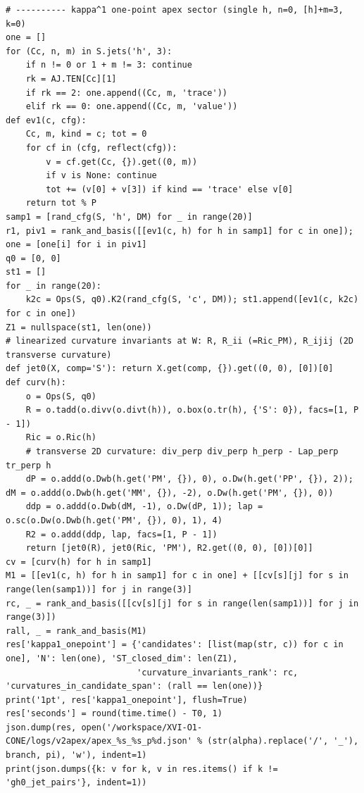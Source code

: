 \documentclass[10pt]{article}
\begin{document}
\begin{lstlisting}
# ---------- kappa^1 one-point apex sector (single h, n=0, [h]+m=3, k=0)
one = []
for (Cc, n, m) in S.jets('h', 3):
    if n != 0 or 1 + m != 3: continue
    rk = AJ.TEN[Cc][1]
    if rk == 2: one.append((Cc, m, 'trace'))
    elif rk == 0: one.append((Cc, m, 'value'))
def ev1(c, cfg):
    Cc, m, kind = c; tot = 0
    for cf in (cfg, reflect(cfg)):
        v = cf.get(Cc, {}).get((0, m))
        if v is None: continue
        tot += (v[0] + v[3]) if kind == 'trace' else v[0]
    return tot % P
samp1 = [rand_cfg(S, 'h', DM) for _ in range(20)]
r1, piv1 = rank_and_basis([[ev1(c, h) for h in samp1] for c in one]); one = [one[i] for i in piv1]
q0 = [0, 0]
st1 = []
for _ in range(20):
    k2c = Ops(S, q0).K2(rand_cfg(S, 'c', DM)); st1.append([ev1(c, k2c) for c in one])
Z1 = nullspace(st1, len(one))
# linearized curvature invariants at W: R, R_ii (=Ric_PM), R_ijij (2D transverse curvature)
def jet0(X, comp='S'): return X.get(comp, {}).get((0, 0), [0])[0]
def curv(h):
    o = Ops(S, q0)
    R = o.tadd(o.divv(o.divt(h)), o.box(o.tr(h), {'S': 0}), facs=[1, P - 1])
    Ric = o.Ric(h)
    # transverse 2D curvature: div_perp div_perp h_perp - Lap_perp tr_perp h
    dP = o.addd(o.Dwb(h.get('PM', {}), 0), o.Dw(h.get('PP', {}), 2)); dM = o.addd(o.Dwb(h.get('MM', {}), -2), o.Dw(h.get('PM', {}), 0))
    ddp = o.addd(o.Dwb(dM, -1), o.Dw(dP, 1)); lap = o.sc(o.Dw(o.Dwb(h.get('PM', {}), 0), 1), 4)
    R2 = o.addd(ddp, lap, facs=[1, P - 1])
    return [jet0(R), jet0(Ric, 'PM'), R2.get((0, 0), [0])[0]]
cv = [curv(h) for h in samp1]
M1 = [[ev1(c, h) for h in samp1] for c in one] + [[cv[s][j] for s in range(len(samp1))] for j in range(3)]
rc, _ = rank_and_basis([[cv[s][j] for s in range(len(samp1))] for j in range(3)])
rall, _ = rank_and_basis(M1)
res['kappa1_onepoint'] = {'candidates': [list(map(str, c)) for c in one], 'N': len(one), 'ST_closed_dim': len(Z1),
                          'curvature_invariants_rank': rc, 'curvatures_in_candidate_span': (rall == len(one))}
print('1pt', res['kappa1_onepoint'], flush=True)
res['seconds'] = round(time.time() - T0, 1)
json.dump(res, open('/workspace/XVI-O1-CONE/logs/v2apex/apex_%s_%s_p%d.json' % (str(alpha).replace('/', '_'), branch, pi), 'w'), indent=1)
print(json.dumps({k: v for k, v in res.items() if k != 'gh0_jet_pairs'}, indent=1))
\end{lstlisting}
\end{document}
